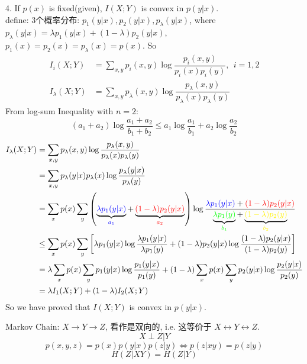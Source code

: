 4. If $p(x)$ is fixed(given), $I(X;Y)$ is convex in $p(y|x)$. \\
define: $3$个概率分布: $p_1(y|x), p_2(y|x), p_{\lambda}(y|x)$, where \\
$p_{\lambda}(y|x)=\lambda p_1(y|x)+(1-\lambda)p_2(y|x)$, $p_1(x)=p_2(x)=p_{\lambda}(x)=p(x)$.
So
\begin{align*}
I_i(X;Y) &= \sum_{x,y}p_i(x,y)\log\dfrac{p_i(x,y)}{p_i(x)p_i(y)},\ \  i=1,2 \\
I_{\lambda}(X;Y) &= \sum_{x,y}p_{\lambda}(x,y)\log\dfrac{p_{\lambda}(x,y)}{p_{\lambda}(x)p_{\lambda}(y)}
\end{align*}
From log-sum Inequality with $n=2$:
$$(a_1+a_2)\log\dfrac{a_1+a_2}{b_1+b_2}\leq a_1\log\dfrac{a_1}{b_1}+a_2\log\dfrac{a_2}{b_2}$$
\begin{align*}
I_{\lambda}(X;Y) &= \sum_{x,y}p_{\lambda}(x,y)\log\dfrac{p_{\lambda}(x,y)}{p_{\lambda}(x)p_{\lambda}(y)} \\
&= \sum_{x,y}p_{\lambda}(y|x)p_{\lambda}(x)\log\dfrac{p_{\lambda}(y|x)}{p_{\lambda}(y)} \\
&= \sum_{x}p(x)\sum_y\left(\underbrace{\textcolor{blue}{\lambda p_1(y|x)}}_{\textcolor{blue}{a_1}}+\underbrace{\textcolor{red}{(1-\lambda)p_2(y|x)}}_{\textcolor{red}{a_2}}\right)\log\dfrac{\textcolor{blue}{\lambda p_1(y|x)}+\textcolor{red}{(1-\lambda)p_2(y|x)}}{\underbrace{\textcolor{green}{\lambda p_1(y)}}_{\textcolor{green}{b_1}}+\underbrace{\textcolor{yellow}{(1-\lambda)p_2(y)}}_{\textcolor{yellow}{b_2}}} \\
&\leq \sum_{x}p(x)\sum_y\left[\lambda p_1(y|x)\log\dfrac{\lambda p_1(y|x)}{\lambda p_1(y)}+(1-\lambda)p_2(y|x)\log\dfrac{(1-\lambda)p_2(y|x)}{(1-\lambda)p_2(y)}\right] \\
&= \lambda\sum_{x}p(x)\sum_y p_1(y|x)\log\dfrac{p_1(y|x)}{p_1(y)} + (1-\lambda)\sum_{x}p(x)\sum_y p_2(y|x)\log\dfrac{p_2(y|x)}{p_2(y)} \\
&= \lambda I_1(X;Y) + (1-\lambda)I_2(X;Y)
\end{align*}
So we have proved that $I(X;Y)$ is convex in $p(y|x)$.\\

\begin{proposition}
Markov Chain: $X\rightarrow Y\rightarrow Z$, 看作是双向的, i.e. 这等价于 $X\leftrightarrow Y\leftrightarrow Z$.\\
$$X\perp Z|Y$$
$$p(x,y,z)=p(x)p(y|x)p(z|y)\Leftrightarrow p(z|xy)=p(z|y)$$
$$H(Z|XY)=H(Z|Y)$$
\end{proposition}

